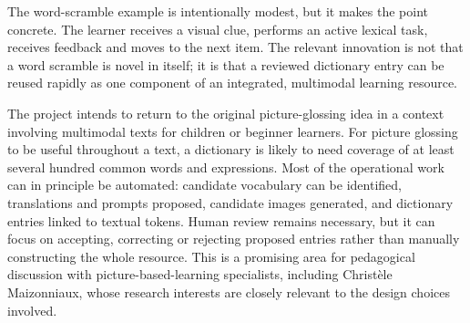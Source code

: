 The word-scramble example is intentionally modest, but it makes the point
concrete. The learner receives a visual clue, performs an active lexical task,
receives feedback and moves to the next item. The relevant innovation is not
that a word scramble is novel in itself; it is that a reviewed dictionary
entry can be reused rapidly as one component of an integrated, multimodal
learning resource.

The project intends to return to the original picture-glossing idea in a
context involving multimodal texts for children or beginner learners. For
picture glossing to be useful throughout a text, a dictionary is likely to
need coverage of at least several hundred common words and expressions. Most
of the operational work can in principle be automated: candidate vocabulary
can be identified, translations and prompts proposed, candidate images
generated, and dictionary entries linked to textual tokens. Human review
remains necessary, but it can focus on accepting, correcting or rejecting
proposed entries rather than manually constructing the whole resource. This
is a promising area for pedagogical discussion with picture-based-learning
specialists, including Christ\`ele Maizonniaux, whose research interests are
closely relevant to the design choices involved.
